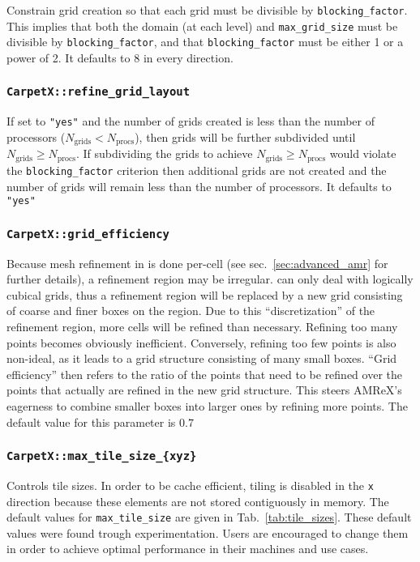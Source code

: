 Constrain grid creation so that each grid must be divisible by \texttt{blocking\_factor}. This implies that both the domain (at each level) and \texttt{max\_grid\_size} must be divisible by \texttt{blocking\_factor}, and that \texttt{blocking\_factor} must be either 1 or a power of 2. It defaults to 8 in every direction.

\subsubsection{\texttt{CarpetX::refine\_grid\_layout}}

If set to \texttt{"yes"} and the number of grids created is less than the number of processors ($N_\text{grids} < N_\text{procs}$), then grids will be further subdivided until $N_\text{grids} \geq N_\text{procs}$. If subdividing the grids to achieve $N_\text{grids} \geq N_\text{procs}$ would violate the \texttt{blocking\_factor} criterion then additional grids are not created and the number of grids will remain less than the number of processors. It defaults to \texttt{"yes"}

\subsubsection{\texttt{CarpetX::grid\_efficiency}}

Because mesh refinement in \AMReX is done per-cell (see sec.~\ref{sec:advanced_amr} for further details), a refinement region may be irregular. \AMReX\space can only deal with logically cubical grids, thus a refinement region will be replaced by a new grid consisting of coarse and finer boxes on the region. Due to this ``discretization'' of the refinement region, more cells will be refined than necessary. Refining too many points becomes obviously inefficient. Conversely, refining too few points is also non-ideal, as it leads to a grid structure consisting of many small boxes. ``Grid efficiency'' then refers to the ratio of the points that need to be refined over the points that actually are refined in the new grid structure. This steers AMReX's eagerness to combine smaller boxes into larger ones by refining more points. The default value for this parameter is $0.7$

\subsubsection{\texttt{CarpetX::max\_tile\_size\_\{xyz\}}}

Controls tile sizes. In order to be cache efficient, tiling is disabled in the \texttt{x} direction because these elements are not stored contiguously in memory. The default values for \texttt{max\_tile\_size} are given in Tab.~\ref{tab:tile_sizes}. These default values were found trough experimentation. Users are encouraged to change them in order to achieve optimal performance in their machines and use cases.

